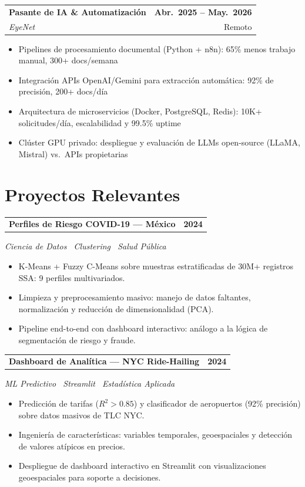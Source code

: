 \documentclass[9.5pt, letterpaper]{article}
\makeatletter
\newcommand{\entryheader}[4]{%
  \noindent
  \begin{tabularx}{\linewidth}{@{}X r@{}}
    {\normalsize\bfseries\color{primary} #1} & {\small\bfseries\color{accent} #2} \\[-1pt]
    {\small\color{textdark}\textit{#3}} & {\footnotesize\color{textlight} #4}
  \end{tabularx}
  \vspace{1pt}
}
\newcommand{\projectentry}[3]{%
  \noindent
  \begin{tabularx}{\linewidth}{@{}X r@{}}
    {\normalsize\bfseries\color{primary} #1} & {\small\bfseries\color{accent} #2}
  \end{tabularx}
  \vspace{-1pt}
  {\small\color{textlight}\textit{#3}}\vspace{2pt}
}
\makeatother
\begin{document}
\entryheader
  {Pasante de IA \& Automatizaci\'on}
  {Abr.\ 2025 -- May.\ 2026}
  {EyeNet \href{https://dvillagrans.dev/projects/eyenet}{\color{accent}\faExternalLink*}}
  {Remoto}
\begin{itemize}
  \item Pipelines de procesamiento documental (Python + n8n): 65\% menos trabajo manual, 300+ docs/semana
  \item Integraci\'on APIs OpenAI/Gemini para extracci\'on autom\'atica: 92\% de precisi\'on, 200+ docs/d\'ia
  \item Arquitectura de microservicios (Docker, PostgreSQL, Redis): 10K+ solicitudes/d\'ia, escalabilidad y 99.5\% uptime
  \item Cl\'uster GPU privado: despliegue y evaluaci\'on de LLMs open-source (LLaMA, Mistral) vs.\ APIs propietarias
\end{itemize}

\section{Proyectos Relevantes}

\projectentry{Perfiles de Riesgo COVID-19 --- M\'exico \href{https://dvillagrans.dev/projects/covid-perfiles}{\color{accent}\faExternalLink*}}{2024}
  {Ciencia de Datos \textbullet\ Clustering \textbullet\ Salud P\'ublica}
\begin{itemize}
  \item K-Means + Fuzzy C-Means sobre muestras estratificadas de 30M+ registros SSA: 9 perfiles multivariados.
  \item Limpieza y preprocesamiento masivo: manejo de datos faltantes, normalizaci\'on y reducci\'on de dimensionalidad (PCA).
  \item Pipeline end-to-end con dashboard interactivo: an\'alogo a la l\'ogica de segmentaci\'on de riesgo y fraude.
\end{itemize}

\projectentry{Dashboard de Anal\'itica --- NYC Ride-Hailing \href{https://nyc-ride-hailing-analytics-dashboard-8ef5n9wjmxxxa8ymaxw9vh.streamlit.app/}{\color{accent}\faExternalLink*}}{2024}
  {ML Predictivo \textbullet\ Streamlit \textbullet\ Estad\'istica Aplicada}
\begin{itemize}
  \item Predicci\'on de tarifas ($R^2 > 0.85$) y clasificador de aeropuertos (92\% precisi\'on) sobre datos masivos de TLC NYC.
  \item Ingenier\'ia de caracter\'isticas: variables temporales, geoespaciales y detecci\'on de valores at\'ipicos en precios.
  \item Despliegue de dashboard interactivo en Streamlit con visualizaciones geoespaciales para soporte a decisiones.
\end{itemize}
\end{document}

